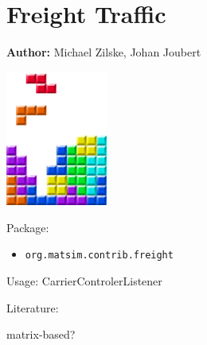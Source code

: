 \chapter{Freight Traffic }
\label{ch:freight}

\hfill \textbf{Author:} Michael Zilske, Johan Joubert

\begin{center} \includegraphics[width=0.25\textwidth, angle=0]{figures/MATSimBook.png} \end{center}


Package:
\begin{itemize}
	\item \lstinline|org.matsim.contrib.freight|
\end{itemize}

Usage: CarrierControlerListener

Literature: \citet[][]{ZilskeEtAl_TechRep_VSP_2012, ShahM_TechRep_IVT_2010}

matrix-based?






